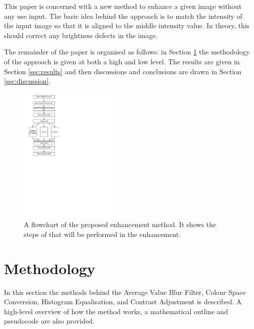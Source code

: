 \documentclass[journal,transmag]{IEEEtran}
\begin{document}
This paper is concerned with a new method to enhance a given image without any use input.  The basic idea behind the approach is to match the intensity of the input image so that it is aligned to the middle intensity value.  In theory, this should correct any brightness defects in the image.

The remainder of the paper is organised as follows: in Section \ref{sec:methods} the methodology of the approach is given at both a high and low level.  The results are given in Section \ref{sec:results} and then discussions and conclusions are drawn in Section \ref{sec:discussion}.

\begin{figure}[h]
\centering
\includegraphics[width=0.42\textwidth]{figures/flowchart}
\caption{A flowchart of the proposed enhancement method. It shows the steps of that will be performed in the enhancement.}
\label{fig:flowchart}
\end{figure}

\section{Methodology}
\label{sec:methods}

In this section the methods behind the Average Value Blur Filter, Colour Space Conversion, Histogram Equalisation, and Contrast Adjustment is described. A high-level overview of how the method works, a mathematical outline and pseudocode are also provided.
\end{document}
